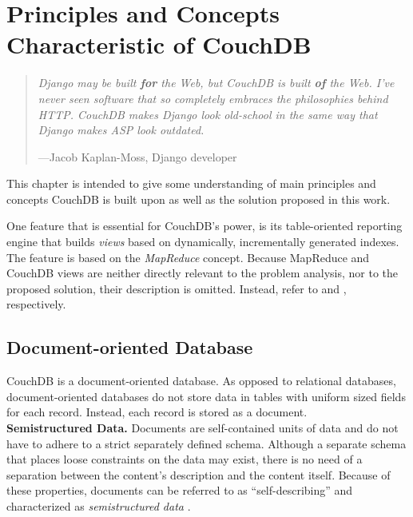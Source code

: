 \chapter{Principles and Concepts Characteristic of CouchDB}

\begin{quote}
{\itshape
Django may be built {\bf\it for} the Web, but CouchDB is built {\bf\it of} the Web. I've never seen software that so completely embraces the philosophies behind HTTP. CouchDB makes Django look old-school in the same way that Django makes ASP look outdated.
}

\hspace{1em}---Jacob Kaplan-Moss, Django developer \cite{Kap07}\\
\end{quote}

\noindent
This chapter is intended to give some understanding of main principles and concepts CouchDB is built upon as well as the solution proposed in this work.

One feature that is essential for CouchDB's power, is its table-oriented reporting engine that builds \emph{views} based on dynamically, incrementally generated indexes. The feature is based on the \emph{MapReduce} concept. Because MapReduce and CouchDB views are neither directly relevant to the problem analysis, nor to the proposed solution, their description is omitted. Instead, refer to \cite{DG04} and \cite[p.~53ff]{ASL10}, respectively.


\section{Document-oriented Database}
\label{Document-oriented Database}

CouchDB is a document-oriented database. As opposed to relational databases, document-oriented databases do not store data in tables with uniform sized fields for each record. Instead, each record is stored as a document.\\

\noindent
{\bf Semistructured Data.}
Documents are self-contained units of data and do not have to adhere to a strict separately defined schema. Although a separate schema that places loose constraints on the data may exist, there is no need of a separation between the content's description and the content itself. Because of these properties, documents can be referred to as ``self-describing'' and characterized as \emph{semistructured data} \cite{Bun97}.

